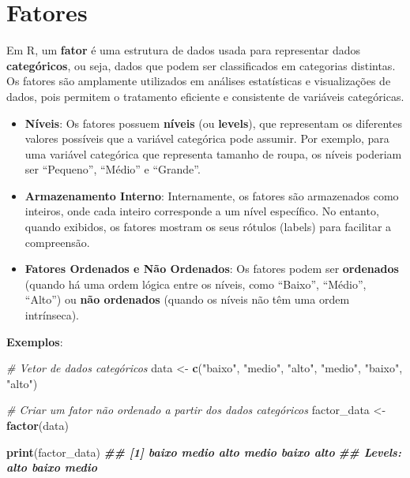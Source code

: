 \documentclass[
]{book}
\newenvironment{Shaded}{\begin{snugshade}}{\end{snugshade}}
\newcommand{\CommentTok}[1]{\textcolor[rgb]{0.56,0.35,0.01}{\textit{#1}}}
\newcommand{\DocumentationTok}[1]{\textcolor[rgb]{0.56,0.35,0.01}{\textbf{\textit{#1}}}}
\newcommand{\FunctionTok}[1]{\textcolor[rgb]{0.13,0.29,0.53}{\textbf{#1}}}
\newcommand{\NormalTok}[1]{#1}
\newcommand{\OtherTok}[1]{\textcolor[rgb]{0.56,0.35,0.01}{#1}}
\newcommand{\StringTok}[1]{\textcolor[rgb]{0.31,0.60,0.02}{#1}}
\providecommand{\tightlist}{%
  \setlength{\itemsep}{0pt}\setlength{\parskip}{0pt}}
\begin{document}
\section{Fatores}\label{fatores}

Em R, um \textbf{fator} é uma estrutura de dados usada para representar dados
\textbf{categóricos}, ou seja, dados que podem ser classificados em
categorias distintas. Os fatores são amplamente utilizados em análises
estatísticas e visualizações de dados, pois permitem o tratamento
eficiente e consistente de variáveis categóricas.

\begin{itemize}
\tightlist
\item
  \textbf{Níveis}: Os fatores possuem \textbf{níveis} (ou \textbf{levels}), que
  representam os diferentes valores possíveis que a variável
  categórica pode assumir. Por exemplo, para uma variável categórica
  que representa tamanho de roupa, os níveis poderiam ser ``Pequeno'',
  ``Médio'' e ``Grande''.
\item
  \textbf{Armazenamento Interno}: Internamente, os fatores são armazenados
  como inteiros, onde cada inteiro corresponde a um nível específico.
  No entanto, quando exibidos, os fatores mostram os seus rótulos
  (labels) para facilitar a compreensão.
\item
  \textbf{Fatores Ordenados e Não Ordenados}: Os fatores podem ser
  \textbf{ordenados} (quando há uma ordem lógica entre os níveis, como
  ``Baixo'', ``Médio'', ``Alto'') ou \textbf{não ordenados} (quando os níveis não
  têm uma ordem intrínseca).
\end{itemize}

\textbf{Exemplos}:

\begin{Shaded}
\begin{Highlighting}[]
\CommentTok{\# Vetor de dados categóricos}
\NormalTok{data }\OtherTok{\textless{}{-}} \FunctionTok{c}\NormalTok{(}\StringTok{"baixo"}\NormalTok{, }\StringTok{"medio"}\NormalTok{, }\StringTok{"alto"}\NormalTok{, }\StringTok{"medio"}\NormalTok{, }\StringTok{"baixo"}\NormalTok{, }\StringTok{"alto"}\NormalTok{)}

\CommentTok{\# Criar um fator não ordenado a partir dos dados categóricos}
\NormalTok{factor\_data }\OtherTok{\textless{}{-}} \FunctionTok{factor}\NormalTok{(data)}

\FunctionTok{print}\NormalTok{(factor\_data)}
\DocumentationTok{\#\# [1] baixo    medio alto   medio baixo    alto}
\DocumentationTok{\#\# Levels: alto baixo medio}
\end{Highlighting}
\end{Shaded}
\end{document}
